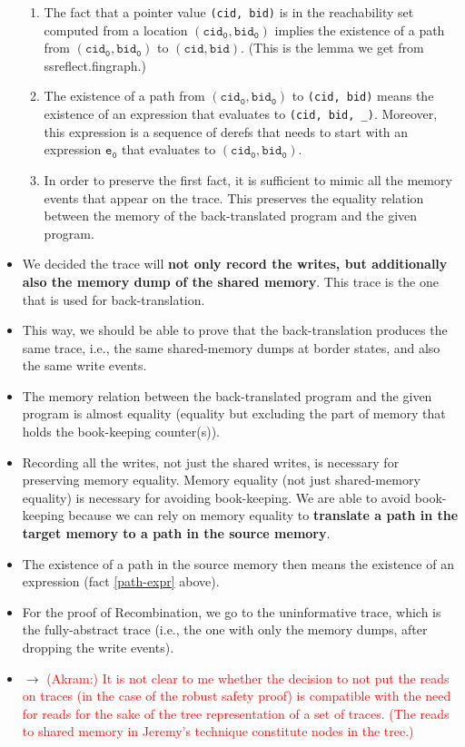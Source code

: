 \documentclass[12pt,a4paper]{article}
\newcommand{\todo}[1]{$\rightarrow$ \textcolor{red}{#1}}
\begin{document}
\begin{itemize}
\begin{enumerate}
\item The fact that
a pointer value \texttt{(cid, bid)} is in the reachability set 
computed from a location $\mathtt{(cid_0, bid_0)}$
 implies the existence of a path
from $\mathtt{(cid_0, bid_0)}$ to $\mathtt{(cid, bid)}$. (This is
the lemma we get from ssreflect.fingraph.)
\item \label{path-expr}
The existence of a path from $\mathtt{(cid_0, bid_0)}$
 to \texttt{(cid, bid)}
 means the existence of an expression that evaluates to 
 \texttt{(cid, bid, \_)}. Moreover, this expression is a sequence
 of derefs that needs to start with an expression $\mathtt{e_0}$ that 
 evaluates to $\mathtt{(cid_0, bid_0)}$.

\item In order to preserve the first fact,
 it is sufficient to mimic all the memory events that appear
 on the trace. This preserves the equality relation between
 the memory of the back-translated program and the given program.
\end{enumerate}

\item We decided the trace will \textbf{not only record the writes, but
additionally also the memory dump of the shared memory}.
This trace is the one that is used for back-translation.

\item This way, we should be able to prove that the back-translation
produces the same trace, i.e., the same shared-memory dumps at
border states, and also the same write events.

\item The memory relation between the back-translated program and
the given program is almost equality (equality 
but excluding the part of memory that holds the book-keeping 
counter(s)).

\item Recording all the writes, not just the shared writes, is 
necessary for preserving memory equality.
Memory equality (not just shared-memory equality) is necessary
for avoiding book-keeping.
We are able to avoid book-keeping 
because we can rely on memory equality to
\textbf{translate a path in the target 
	memory to a path in the source memory}.

\item The existence of a path in the source memory then means the
existence of an expression (fact \ref{path-expr} above).

\item For the proof of Recombination, 
we go to the uninformative trace,
which is the fully-abstract trace (i.e., the one with only
the memory dumps, after dropping the write events).

\item \todo{(Akram:) It is not clear to me whether
the decision to not put the reads on traces 
(in the case of the robust safety proof)
is compatible with the need
for reads for the sake of the tree representation
of a set of traces. (The reads to shared memory in 
Jeremy's technique constitute
nodes in the tree.)
}
\end{itemize}
\end{document}
